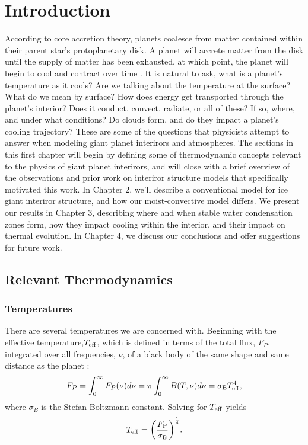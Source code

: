 \documentclass[11pt]{ucscthesisbs}
\begin{document}

\chapter{Introduction}
According to core accretion theory, planets coalesce from matter contained within their parent star's protoplanetary disk. A planet will accrete matter from the disk until the supply of matter has been exhausted, at which point, the planet will begin to cool and contract over time \citep{2007prpl.conf..591L,2013apf..book.....A}. It is natural to ask, what is a planet's temperature as it cools? Are we talking about the temperature at the surface? What do we mean by surface? How does energy get transported through the planet's interior? Does it conduct, convect, radiate, or all of these? If so, where, and under what conditions? Do clouds form, and do they impact a planet's cooling trajectory? These are some of the questions that physicists attempt to answer when modeling giant planet interirors and atmospheres. The sections in this first chapter will begin by defining some of thermodynamic concepts relevant to the physics of giant planet interirors, and will close with a brief overview of the observations and prior work on interiror structure models that specifically motivated this work. In Chapter 2, we'll describe a conventional model for ice giant interiror structure, and how our moist-convective model differs. We present our results in Chapter 3, describing where and when stable water condensation zones form, how they impact cooling within the interior, and their impact on thermal evolution. In Chapter 4, we discuss our conclusions and offer suggestions for future work.

\section{Relevant Thermodynamics}
\subsection{Temperatures}
There are several temperatures we are concerned with. Beginning with the effective temperature,$T_{\rm eff}$, which is defined in terms of the total flux, $F_{P}$, integrated over all frequencies, $\nu$, of a black body of the same shape and same distance as the planet \citep{2010eapp.book.....S}:
\begin{equation}
   F_{P} =  \int_{0}^{\infty} F_{P}(\nu)  d\nu = \pi \int_{0}^{\infty} B(T, \nu) d\nu = \sigma_{\rm B}T_{\rm eff}^{4},
  \label{eq:effective_temp_integral}
\end{equation}  
where $\sigma_{B}$ is the Stefan-Boltzmann constant. Solving for $T_{\rm eff}$ yields
\begin{equation}
    T_{\rm eff} = \bigg(\frac{F_{\rm P}}{\sigma_{\rm B}}\bigg)^{\frac{1}{4}}.
  \label{eq:effective_temp}
\end{equation}
\end{document}
